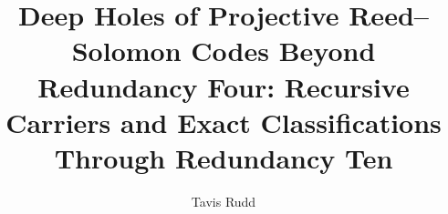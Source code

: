 \documentclass[10pt,journal,onecolumn]{IEEEtran}
\title{Deep Holes of Projective Reed--Solomon Codes Beyond Redundancy Four:
Recursive Carriers and Exact Classifications Through Redundancy Ten}
\author{Tavis Rudd}
\theoremstyle{upright}
\theoremstyle{definition}
\theoremstyle{remark}
\begin{document}
\raggedbottom
\maketitle

\begin{abstract}

\end{abstract}

\begin{IEEEkeywords}

\end{IEEEkeywords}










\appendices




\clearpage



\end{document}
